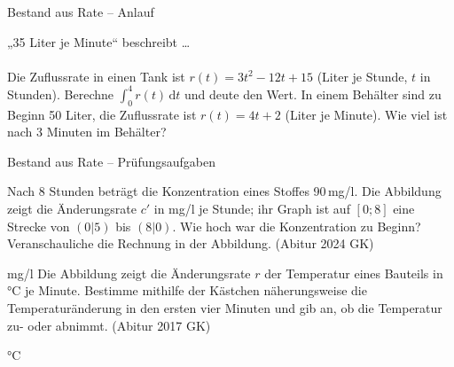 \setcounter{aufgabe}{21}

\begin{aufgabe}{Bestand aus Rate – Anlauf}
\begin{teile}
\teil „35 Liter je Minute“ beschreibt … \\  \\ 
\teil Die Zuflussrate in einen Tank ist $r(t) = 3t^2 - 12t + 15$ (Liter je Stunde, $t$ in Stunden). Berechne $∫_0^4 r(t)\,\mathrm{d}t$ und deute den Wert. \leerfeld
\teil In einem Behälter sind zu Beginn 50 Liter, die Zuflussrate ist $r(t) = 4t + 2$ (Liter je Minute). Wie viel ist nach 3 Minuten im Behälter? \leerfeld[l]
\end{teile}
\end{aufgabe}

\begin{aufgabe}{Bestand aus Rate – Prüfungsaufgaben}
\begin{teile}
\teil Nach 8 Stunden beträgt die Konzentration eines Stoffes 90\,mg/l. Die Abbildung zeigt die Änderungsrate $c'$ in mg/l je Stunde; ihr Graph ist auf $[0; 8]$ eine Strecke von $(0 | 5)$ bis $(8 | 0)$. Wie hoch war die Konzentration zu Beginn? Veranschauliche die Rechnung in der Abbildung. \hfill (Abitur 2024 GK) \\

\begin{ksys}[xmin=0,xmax=9,ymin=-1,ymax=6,xlabel=t,ylabel=c',ablesen]  \end{ksys}
\leerfeld mg/l
\teil Die Abbildung zeigt die Änderungsrate $r$ der Temperatur eines Bauteils in °C je Minute. Bestimme mithilfe der Kästchen näherungsweise die Temperaturänderung in den ersten vier Minuten und gib an, ob die Temperatur zu- oder abnimmt. \hfill (Abitur 2017 GK) \\

\begin{ksys}[xmin=0,xmax=6,ymin=-2,ymax=2,xlabel=t,ylabel=r,ablesen]  \end{ksys}
\leerfeld °C
\end{teile}
\end{aufgabe}

